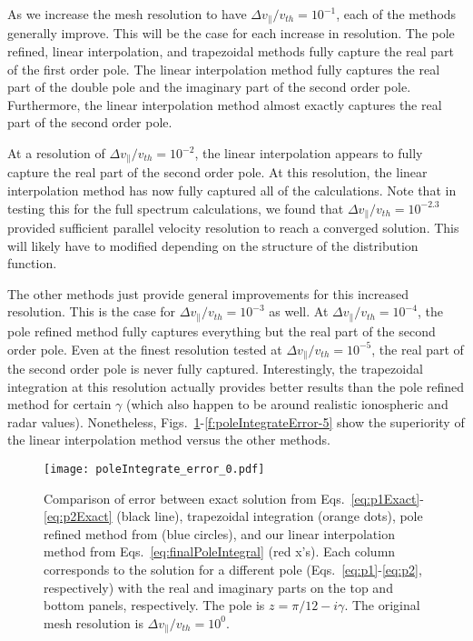 As we increase the mesh resolution to have $\Delta v_\parallel/v_{th}=10^{-1}$, each of the methods generally improve.
This will be the case for each increase in resolution.
The pole refined, linear interpolation, and trapezoidal methods fully capture the real part of the first order pole. 
The linear interpolation method fully captures the real part of the double pole and the imaginary part of the second order pole.
Furthermore, the linear interpolation method almost exactly captures the real part of the second order pole.


At a resolution of $\Delta v_\parallel/v_{th}=10^{-2}$, the linear interpolation appears to fully capture the real part of the second order pole.
At this resolution, the linear interpolation method has now fully captured all of the calculations. 
Note that in testing this for the full spectrum calculations, we found that $\Delta v_\parallel/v_{th}=10^{-2.3}$ provided sufficient parallel velocity resolution to reach a converged solution. 
This will likely have to modified depending on the structure of the distribution function.

The other methods just provide general improvements for this increased resolution. 
This is the case for $\Delta v_\parallel/v_{th}=10^{-3}$ as well.
At $\Delta v_\parallel/v_{th}=10^{-4}$, the pole refined method fully captures everything but the real part of the second order pole.
Even at the finest resolution tested at $\Delta v_\parallel/v_{th}=10^{-5}$, the real part of the second order pole is never fully captured.
Interestingly, the trapezoidal integration at this resolution actually provides better results than the pole refined method for certain $\gamma$ (which also happen to be around realistic ionospheric and radar values).
Nonetheless, Figs.~\ref{f:poleIntegrateError0}-\ref{f:poleIntegrateError-5} show the superiority of the linear interpolation method versus the other methods.

\begin{figure}[!htb]
	\texttt{[image: poleIntegrate\_error\_0.pdf]}
	\caption{Comparison of error between exact solution from Eqs.~\ref{eq:p1Exact}-\ref{eq:p2Exact} (black line),
		trapezoidal integration (orange dots),
		pole refined method from \cite{longley2024} (blue circles),
		and our linear interpolation method from Eqs.~\ref{eq:finalPoleIntegral} (red x's).
		Each column corresponds to the solution for a different pole (Eqs.~\ref{eq:p1}-\ref{eq:p2}, respectively)
		with the real and imaginary parts on the top and bottom panels, respectively.
		The pole is $z=\pi/12-i\gamma$.
		The original mesh resolution is $\Delta v_\parallel/v_{th}=10^0$.}
	\label{f:poleIntegrateError0}
\end{figure}


